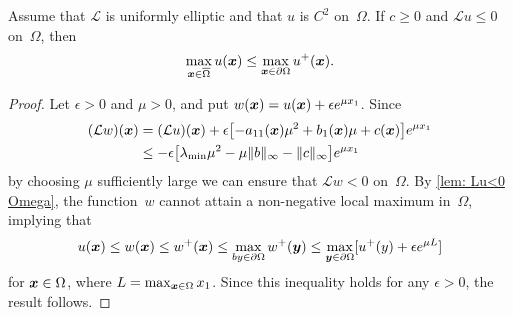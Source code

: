 \begin{theorem}\label{thm: max principle}
Assume that $\mathcal{L}$ is uniformly elliptic and that $u$ is $C^2$ 
on~$\Omega$.  If $c\ge0$ and $\mathcal{L}u\le0$ on~$\Omega$, then 
\[
\max_{\boldsymbol{x}\in\overline{\Omega}}u(\boldsymbol{x})\le\max_{\boldsymbol{x}\in\partial\Omega}u^+(\boldsymbol{x}).
\]
\end{theorem}
\begin{proof}
Let $\epsilon>0$ and $\mu>0$, and put $w(\boldsymbol{x})=u(\boldsymbol{x})+\epsilon e^{\mu x_1}$.
Since
\begin{align*}
(\mathcal{L}w)(\boldsymbol{x})&=(\mathcal{L}u)(\boldsymbol{x})+\epsilon\bigl[-a_{11}(\boldsymbol{x})\mu^2
	+b_1(\boldsymbol{x})\mu+c(\boldsymbol{x})\bigr]e^{\mu x_1}\\
	&\le-\epsilon\bigl[\lambda_{\min}\mu^2
	-\mu\|b\|_\infty-\|c\|_\infty\bigr]e^{\mu x_1}
\end{align*}
by choosing $\mu$ sufficiently large we can ensure that $\mathcal{L}w<0$
on~$\Omega$.  By \cref{lem: Lu<0 Omega}, the function~$w$ cannot attain a
non-negative local maximum in~$\Omega$, implying that
\[
u(\boldsymbol{x})\le w(\boldsymbol{x})\le w^+(\boldsymbol{x})\le\max_{by\in\partial\Omega}w^+(\boldsymbol{y})
	\le\max_{\boldsymbol{y}\in\partial\Omega}[u^+(y)+\epsilon e^{\mu L}]
\]
for $\boldsymbol{x}\in\Omega$, where $L=\max_{\boldsymbol{x}\in\Omega} x_1$.  Since this inequality
holds for any $\epsilon>0$, the result follows.
\end{proof}

